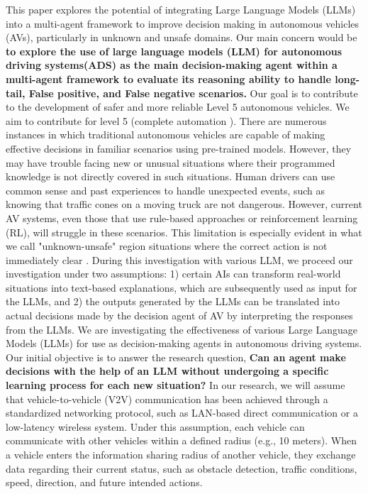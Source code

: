 \documentclass[conference]{IEEEtran}
\begin{document}
This paper explores the potential of integrating Large Language Models (LLMs)\cite{zhang2024instruct} into a multi-agent framework to improve decision making in autonomous vehicles (AVs), particularly in unknown and unsafe domains.
Our main concern would be \textbf{ to explore the use of large language models (LLM) for autonomous driving systems(ADS) as the main decision-making agent within a multi-agent framework to evaluate its reasoning ability to handle long-tail, False positive, and False negative scenarios.} Our goal is to contribute to the development of safer and more reliable Level 5\cite{balasubramaniam2022object} autonomous vehicles. We aim to contribute for level 5 (complete automation \cite{raza2018autonomous}). There are numerous instances in which traditional autonomous vehicles are capable of making effective decisions in familiar scenarios using pre-trained models.  However, they may have trouble facing new or unusual situations where their programmed knowledge is not directly covered in such situations. Human drivers can use common sense and past experiences to handle unexpected events, such as knowing that traffic cones on a moving truck are not dangerous. However, current AV systems, even those that use rule-based approaches or reinforcement learning (RL\cite{kaelbling1996reinforcement}), will struggle in these scenarios. This limitation is especially evident in what we call "unknown-unsafe" region situations where the correct action is not immediately clear \cite{fu2024drive}.
During this investigation with various LLM, we proceed our investigation under two assumptions: 1) certain AIs can transform real-world situations into text-based explanations, which are subsequently used as input for the LLMs, and 2) the outputs generated by the LLMs can be translated into actual decisions made by the decision agent of AV by interpreting the responses from the LLMs. We are investigating the effectiveness of various Large Language Models (LLMs) for use as decision-making agents in autonomous driving systems. Our initial objective is to answer the research question, \textbf{Can an agent make decisions with the help of an LLM without undergoing a specific learning process for each new situation?}
In our research, we will assume that vehicle-to-vehicle (V2V) communication has been achieved through a standardized networking protocol, such as LAN-based direct communication or a low-latency wireless system. Under this assumption, each vehicle can communicate with other vehicles within a defined radius (e.g., 10 meters). When a vehicle enters the information sharing radius of another vehicle, they exchange data regarding their current status, such as obstacle detection, traffic conditions, speed, direction, and future intended actions.
\end{document}
